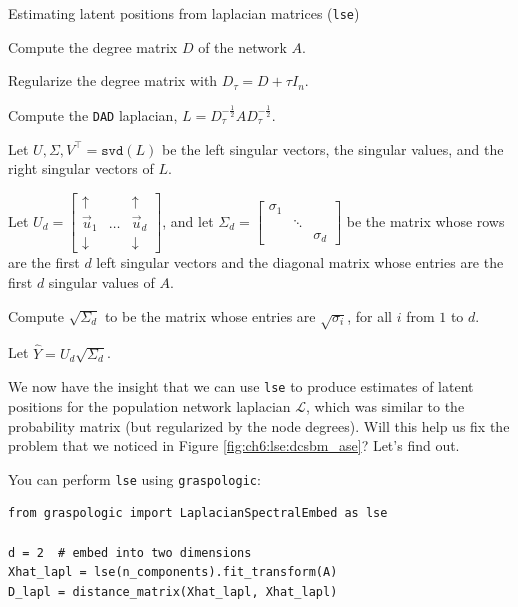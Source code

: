 \begin{algorithm}[h]\caption{Estimating latent positions from laplacian matrices (\texttt{lse})}
\label{alg:ch6:lse}
\SetAlgoLined
Compute the degree matrix $D$ of the network $A$.

Regularize the degree matrix with $D_\tau = D + \tau I_n$.

Compute the \texttt{DAD} laplacian, $L = D_\tau^{-\frac{1}{2}}A D_{\tau}^{-\frac{1}{2}}$.

Let $U, \Sigma, V^\top = \texttt{svd}(L)$ be the left singular vectors, the singular values, and the right singular vectors of $L$.

Let $U_d = \begin{bmatrix}
    \uparrow & & \uparrow \\
    \vec u_1 & \hdots & \vec u_d \\
    \downarrow & & \downarrow
\end{bmatrix}$, and let $\Sigma_d = \begin{bmatrix}
    \sigma_1 & & \\
    & \ddots & \\
    & & \sigma_d
\end{bmatrix}$ be the matrix whose rows are the first $d$ left singular vectors and the diagonal matrix whose entries are the first $d$ singular values of $A$.

Compute $\sqrt{\Sigma_d}$ to be the matrix whose entries are $\sqrt{\sigma_i}$, for all $i$ from $1$ to $d$.

Let $\hat Y = U_d \sqrt{\Sigma_d}$.

\end{algorithm}

We now have the insight that we can use \texttt{lse} to produce estimates of latent positions for the population network laplacian $\mathcal L$, which was similar to the probability matrix (but regularized by the node degrees). Will this help us fix the problem that we noticed in Figure \ref{fig:ch6:lse:dcsbm_ase}? Let's find out.

You can perform \texttt{lse} using \texttt{graspologic}:

\begin{lstlisting}[style=python]
from graspologic import LaplacianSpectralEmbed as lse

d = 2  # embed into two dimensions
Xhat_lapl = lse(n_components).fit_transform(A)
D_lapl = distance_matrix(Xhat_lapl, Xhat_lapl)
\end{lstlisting}

